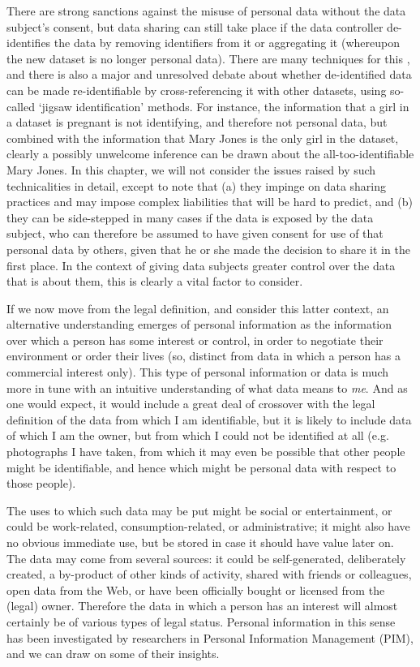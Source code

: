\documentclass[graybox]{svmult}
\begin{document}
There are strong sanctions against the misuse of personal data without the data subject’s consent, but data sharing can still take place if the data controller de-identifies the data by removing identifiers from it or aggregating it (whereupon the new dataset is no longer personal data). There are many techniques for this \cite{}, and there is also a major and unresolved debate \cite{} about whether de-identified data can be made re-identifiable by cross-referencing it with other datasets, using so-called `jigsaw identification’ methods. For instance, the information that a girl in a dataset is pregnant is not identifying, and therefore not personal data, but combined with the information that Mary Jones is the only girl in the dataset, clearly a possibly unwelcome inference can be drawn about the all-too-identifiable Mary Jones. In this chapter, we will not consider the issues raised by such technicalities in detail, except to note that (a) they impinge on data sharing practices and may impose complex liabilities that will be hard to predict, and (b) they can be side-stepped in many cases if the data is exposed by the data subject, who can therefore be assumed to have given consent for use of that personal data by others, given that he or she made the decision to share it in the first place. In the context of giving data subjects greater control over the data that is about them, this is clearly a vital factor to consider.

If we now move from the legal definition, and consider this latter context, an alternative understanding emerges of personal information as the information over which a person has some interest or control, in order to negotiate their environment or order their lives (so, distinct from data in which a person has a commercial interest only). This type of personal information or data is much more in tune with an intuitive understanding of what data means to {\em me}. And as one would expect, it would include a great deal of crossover with the legal definition of the data from which I am identifiable, but it is likely to include data of which I am the owner, but from which I could not be identified at all (e.g. photographs I have taken, from which it may even be possible that other people might be identifiable, and hence which might be personal data with respect to those people).

The uses to which such data may be put might be social or entertainment, or could be work-related, consumption-related, or administrative; it might also have no obvious immediate use, but be stored in case it should have value later on. The data may come from several sources: it could be self-generated, deliberately created, a by-product of other kinds of activity, shared with friends or colleagues, open data from the Web, or have been officially bought or licensed from the (legal) owner. Therefore the data in which a person has an interest will almost certainly be of various types of legal status. Personal information in this sense has been investigated by researchers in Personal Information Management (PIM), and we can draw on some of their insights.
\end{document}
